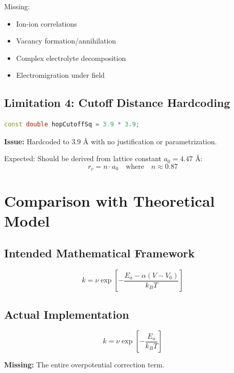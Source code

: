 \documentclass[11pt,a4paper]{article}
\begin{document}
Missing:
\begin{itemize}
    \item Ion-ion correlations
    \item Vacancy formation/annihilation
    \item Complex electrolyte decomposition
    \item Electromigration under field
\end{itemize}

\subsection{Limitation 4: Cutoff Distance Hardcoding}

\begin{lstlisting}[language=C++, breaklines=true]
const double hopCutoffSq = 3.9 * 3.9;
\end{lstlisting}

\textbf{Issue:} Hardcoded to $3.9$ Å with no justification or parametrization.

Expected: Should be derived from lattice constant $a_0 = 4.47$ Å:
\begin{equation}
r_c = n \cdot a_0 \quad \text{where} \quad n \approx 0.87
\end{equation}

\newpage

\section{Comparison with Theoretical Model}

\subsection{Intended Mathematical Framework}

\begin{equation}
k = \nu \exp\left[-\frac{E_a - \alpha(V - V_0)}{k_B T}\right]
\end{equation}

\subsection{Actual Implementation}

\begin{equation}
k = \nu \exp\left[-\frac{E_a}{k_B T}\right]
\end{equation}

\textbf{Missing:} The entire overpotential correction term.
\end{document}
